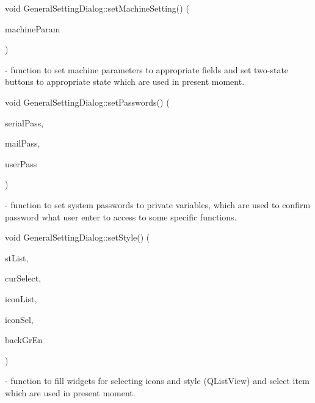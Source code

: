 \mbox{\label{classGeneralSettingDialog_a62392d2454fdaf652f789792b50f9c6c}} 
{\footnotesize\ttfamily void General\+Setting\+Dialog\+::\texorpdfstring{set\+Machine\+Setting()}{setMachineSetting()} (\begin{DoxyParamCaption}\item[{\mbox{\hyperlink{classMachineSettings_a87879e13793dbc7c10d4fa18e1236751}{Machine\+Settings\+::\+Machine\+Parameters}}}]{machine\+Param }\end{DoxyParamCaption})} - function to set machine parameters to appropriate fields and set two-state buttons to appropriate state which are used in present moment.

\mbox{\label{classGeneralSettingDialog_a73e0c08d830948be4ec0f8d3d155c5ca}} 
{\footnotesize\ttfamily void General\+Setting\+Dialog\+::\texorpdfstring{set\+Passwords()}{setPasswords()} (\begin{DoxyParamCaption}\item[{\mbox{\hyperlink{settings_8h_a017dd44e68049ffdd31500a8cd01ba68}{uint16\+\_\+t}}}]{serial\+Pass,  }\item[{\mbox{\hyperlink{settings_8h_a017dd44e68049ffdd31500a8cd01ba68}{uint16\+\_\+t}}}]{mail\+Pass,  }\item[{\mbox{\hyperlink{settings_8h_a017dd44e68049ffdd31500a8cd01ba68}{uint16\+\_\+t}}}]{user\+Pass }\end{DoxyParamCaption})} - function to set system passwords to private variables, which are used to confirm password what user enter to access to some specific functions. 

\mbox{\label{classGeneralSettingDialog_a1746ad8d326d2adff1e8297f48119835}} 
{\footnotesize\ttfamily void General\+Setting\+Dialog\+::\texorpdfstring{set\+Style()}{setStyle()} (\begin{DoxyParamCaption}\item[{Q\+String\+List}]{st\+List,  }\item[{int}]{cur\+Select,  }\item[{Q\+String\+List}]{icon\+List,  }\item[{int}]{icon\+Sel,  }\item[{bool}]{back\+Gr\+En }\end{DoxyParamCaption})}  - function to fill widgets for selecting icons and style (Q\+List\+View) and select item which are used in present moment.


